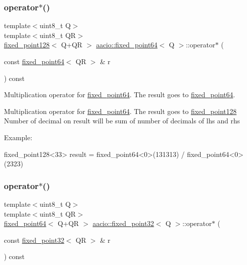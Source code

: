 \subsubsection{\texorpdfstring{operator$\ast$()}{operator*()}\hspace{0.1cm}{\footnotesize\ttfamily [1/2]}}
{\footnotesize\ttfamily template$<$uint8\+\_\+t Q$>$ \\
template$<$uint8\+\_\+t QR$>$ \\
\mbox{\hyperlink{structaacio_1_1fixed__point128}{fixed\+\_\+point128}}$<$ Q+QR $>$ \mbox{\hyperlink{structaacio_1_1fixed__point64}{aacio\+::fixed\+\_\+point64}}$<$ Q $>$\+::operator$\ast$ (\begin{DoxyParamCaption}\item[{const \mbox{\hyperlink{structaacio_1_1fixed__point64}{fixed\+\_\+point64}}$<$ QR $>$ \&}]{r }\end{DoxyParamCaption}) const}



Multiplication operator for \mbox{\hyperlink{structaacio_1_1fixed__point64}{fixed\+\_\+point64}}. The result goes to \mbox{\hyperlink{structaacio_1_1fixed__point64}{fixed\+\_\+point64}}. 

Multiplication operator for \mbox{\hyperlink{structaacio_1_1fixed__point64}{fixed\+\_\+point64}}. The result goes to \mbox{\hyperlink{structaacio_1_1fixed__point128}{fixed\+\_\+point128}} Number of decimal on result will be sum of number of decimals of lhs and rhs

Example\+: 
\begin{DoxyCode}
fixed\_point128<33> result = fixed\_point64<0>(131313) / fixed\_point64<0>(2323)
\end{DoxyCode}
 \mbox{\label{group__fixedpoint_gae967c9f563576da13c0ba7617aaea623}} 
\subsubsection{\texorpdfstring{operator$\ast$()}{operator*()}\hspace{0.1cm}{\footnotesize\ttfamily [2/2]}}
{\footnotesize\ttfamily template$<$uint8\+\_\+t Q$>$ \\
template$<$uint8\+\_\+t QR$>$ \\
\mbox{\hyperlink{structaacio_1_1fixed__point64}{fixed\+\_\+point64}}$<$ Q+QR $>$ \mbox{\hyperlink{structaacio_1_1fixed__point32}{aacio\+::fixed\+\_\+point32}}$<$ Q $>$\+::operator$\ast$ (\begin{DoxyParamCaption}\item[{const \mbox{\hyperlink{structaacio_1_1fixed__point32}{fixed\+\_\+point32}}$<$ QR $>$ \&}]{r }\end{DoxyParamCaption}) const}



